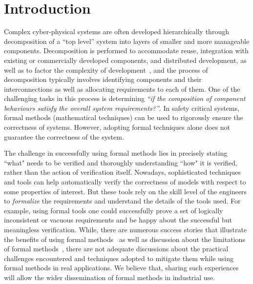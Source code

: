 \section{Introduction}
\label{sec:intro}

Complex cyber-physical systems are often developed hierarchically through decomposition of a ``top level'' system into layers of smaller and more manageable components.  Decomposition is performed to accommodate reuse, integration with existing or commercially developed components, and distributed development, as well as to factor the complexity of development~\cite{Hammond01:WiW}, and the process of decomposition typically involves identifying  components and their interconnections as well as allocating requirements to each of them. One of the challenging tasks in this process is determining \emph{``if the composition of component behaviours satisfy the overall system requirements?''}. In safety critical systems, formal methods (mathematical techniques) can be used to rigorously ensure the correctness of systems. However, adopting formal techniques alone does not guarantee the correctness of the system.

The challenge in successfully using formal methods lies in precisely stating ``what" needs to be verified and thoroughly understanding ``how" it is verified, rather than the action of verification itself. Nowadays, sophisticated techniques and tools can help automatically verify the correctness of models with respect to some properties of interest.  But these tools rely on the skill level of the engineers to \emph{formalize} the requirements and understand the details of the tools used. For example, using formal tools one could successfully prove a set of logically inconsistent or vacuous requirements and be happy about the successful but meaningless verification. While, there are numerous success stories that illustrate the benefits of using formal methods~\cite{Miller03:shalls,Whalen07:FMICS} as well as discussion about the limitations of formal methods~\cite{kneuper1997limits,hall1990seven}, there are not adequate discussions about the practical challenges encountered and techniques adopted to mitigate them while using formal methods in real applications. We believe that, sharing such experiences will allow the wider dissemination of formal methods in industrial use.

